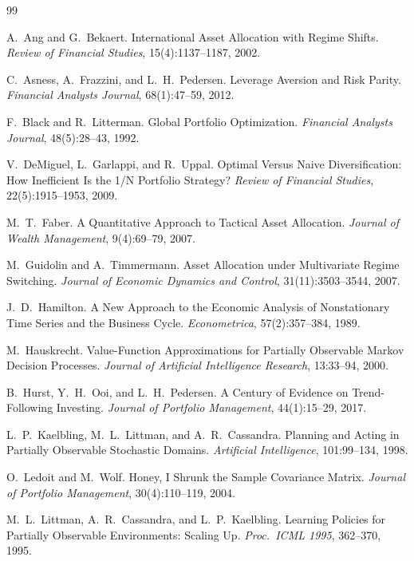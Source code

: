 \documentclass[11pt]{article}
\theoremstyle{plain1}
\theoremstyle{definition1}
\newcommand{\1}{\mathbf{1}}
\begin{document}
\begin{thebibliography}{99}\small\setlength{\itemsep}{0pt}

 A.\ Ang and G.\ Bekaert. International Asset Allocation with Regime Shifts. \emph{Review of Financial Studies}, 15(4):1137--1187, 2002.

 C.\ Asness, A.\ Frazzini, and L.\ H.\ Pedersen. Leverage Aversion and Risk Parity. \emph{Financial Analysts Journal}, 68(1):47--59, 2012.

 F.\ Black and R.\ Litterman. Global Portfolio Optimization. \emph{Financial Analysts Journal}, 48(5):28--43, 1992.

 V.\ DeMiguel, L.\ Garlappi, and R.\ Uppal. Optimal Versus Naive Diversification: How Inefficient Is the 1/N Portfolio Strategy? \emph{Review of Financial Studies}, 22(5):1915--1953, 2009.

 M.\ T.\ Faber. A Quantitative Approach to Tactical Asset Allocation. \emph{Journal of Wealth Management}, 9(4):69--79, 2007.

 M.\ Guidolin and A.\ Timmermann. Asset Allocation under Multivariate Regime Switching. \emph{Journal of Economic Dynamics and Control}, 31(11):3503--3544, 2007.

 J.\ D.\ Hamilton. A New Approach to the Economic Analysis of Nonstationary Time Series and the Business Cycle. \emph{Econometrica}, 57(2):357--384, 1989.

 M.\ Hauskrecht. Value-Function Approximations for Partially Observable Markov Decision Processes. \emph{Journal of Artificial Intelligence Research}, 13:33--94, 2000.

 B.\ Hurst, Y.\ H.\ Ooi, and L.\ H.\ Pedersen. A Century of Evidence on Trend-Following Investing. \emph{Journal of Portfolio Management}, 44(1):15--29, 2017.

 L.\ P.\ Kaelbling, M.\ L.\ Littman, and A.\ R.\ Cassandra. Planning and Acting in Partially Observable Stochastic Domains. \emph{Artificial Intelligence}, 101:99--134, 1998.

 O.\ Ledoit and M.\ Wolf. Honey, I Shrunk the Sample Covariance Matrix. \emph{Journal of Portfolio Management}, 30(4):110--119, 2004.

 M.\ L.\ Littman, A.\ R.\ Cassandra, and L.\ P.\ Kaelbling. Learning Policies for Partially Observable Environments: Scaling Up. \emph{Proc.\ ICML 1995}, 362--370, 1995.


\end{thebibliography}
\end{document}
